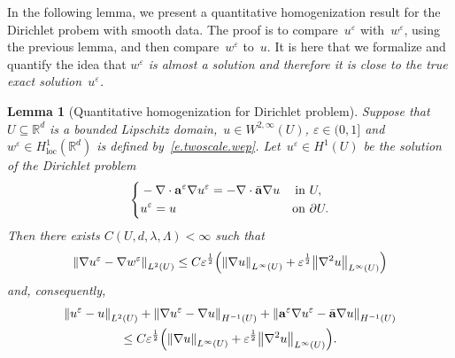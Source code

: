 \documentclass[11pt]{article} %
\numberwithin{equation}{section}
\newtheorem{lemma}[theorem]{Lemma}
\theoremstyle{definition}
\let\originalleft\left
\let\originalright\right
\renewcommand{\left}{\mathopen{}\mathclose\bgroup\originalleft}
\renewcommand{\right}{\aftergroup\egroup\originalright}
\newcommand*{\Rd}{\ensuremath{\mathbb{R}^d}}
\newcommand{\eps}{\varepsilon}
\newcommand{\ep}{\eps}
\renewcommand{\a}{\mathbf{a}}
\newcommand{\ahom}{\bar{\a}}
\begin{document}
In the following lemma, we present a quantitative homogenization result for the Dirichlet probem with smooth data. The proof is to compare~$u^\ep$ with~$w^\ep$, using the previous lemma, and then compare~$w^\ep$ to~$u$.  It is here that we formalize and quantify the idea that \emph{$w^\ep$ is almost a solution and therefore it is close to the true exact solution~$u^\ep$.} 


\begin{lemma}[Quantitative homogenization for Dirichlet problem]
\label{l.DP.2infty}
Suppose that~$U\subseteq\Rd$ is a bounded Lipschitz domain,~$u\in W^{2,\infty}(U)$, $\ep\in (0,1]$ and~$w^\ep\in H^1_{\mathrm{loc}}(\Rd)$ is defined by~\eqref{e.twoscale.wep}. Let~$u^\ep \in H^1(U)$ be the solution of the Dirichlet problem 
\begin{align}
\label{e.eq.DP.2infty}
\left\{
\begin{aligned}
& -\nabla \cdot \a^\ep \nabla u^\ep = - \nabla \cdot \ahom\nabla u & \mbox{in} & \ U, 
\\
& u^\ep = u & \mbox{on} & \ \partial U. 
\end{aligned}
\right.
\end{align}
Then there exists $C(U,d,\lambda,\Lambda)<\infty$ such that 
\begin{equation}
\label{e.ee.easy}
\left\| \nabla u^\ep - \nabla w^\ep \right\|_{{L}^2(U)} 
\leq
C \ep^{\frac12} \left(  \left\| \nabla u \right\|_{L^\infty(U)}
+
\ep^{\frac12} \left\| \nabla^2 u \right\|_{L^\infty(U)}
\right)
\end{equation}
and, consequently, 
\begin{multline}
\label{e.ee.easy2}
\left\| 
u^\ep - u 
\right\|_{L^2(U)} 
+
\left\| 
\nabla u^\ep - \nabla u \right\|_{H^{-1}(U)} 
+
\left\| 
\a^\ep \nabla u^\ep - \ahom \nabla u \right\|_{H^{-1}(U)}
\\
\leq 
C \ep^{\frac12} \left(  \left\| \nabla u \right\|_{L^\infty(U)}
+
\ep^{\frac12} \left\| \nabla^2 u \right\|_{L^\infty(U)}
\right).
\end{multline}
\end{lemma}
\end{document}
